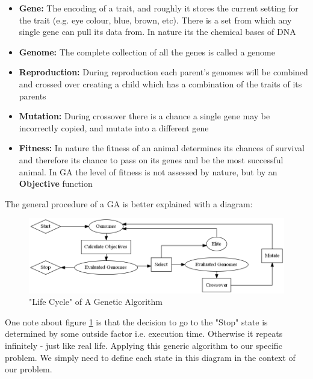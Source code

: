 \documentclass[11pt]{article}
\begin{document}
    \begin{itemize}
        \item{\textbf{Gene:} The encoding of a trait, and roughly it stores the current
            setting for the trait (e.g. eye colour, blue, brown, etc). There is a set
            from which any single gene can pull its data from. In nature its the chemical
            bases  of DNA}
        \item{\textbf{Genome:} The complete collection of all the genes is called a
            genome}
        \item{\textbf{Reproduction:} During reproduction each parent's genomes will be
            combined and crossed over creating a child which has a combination of
            the traits of its parents}
        \item{\textbf{Mutation:} During crossover there is a chance a single gene
            may be incorrectly copied, and mutate into a different gene}
        \item{\textbf{Fitness: } In nature the fitness of an animal determines
            its chances of survival and therefore its chance to pass on its genes
            and be the most successful animal. In GA the level of fitness is not assessed
            by nature, but by an \textbf{Objective} function}
    \end{itemize}

    The general procedure of a GA is better explained with a diagram:

    \begin{figure}[H] %
        \centering
        \includegraphics[width=\textwidth]{GA}
        \caption{"Life Cycle" of A Genetic Algorithm}\label{fig:GA}
    \end{figure}

    One note about figure \ref{fig:GA} is that the decision to go to the "Stop"
    state is determined by some outside factor i.e. execution time. Otherwise
    it repeats infinitely - just like real life. Applying this generic algorithm to 
    our specific problem. We simply need to
    define each state in this diagram in the context of our problem.
\end{document}
